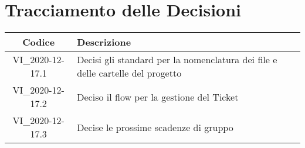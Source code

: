 \section*{Tracciamento delle Decisioni}

\begin{center}
	\begin{longtable}{|c|p{14.5cm}|}
	\hline
	\rowcolor{lighter-grayer}
	\textbf{Codice} & \textbf{Descrizione} \\
	\hline
	\endfirsthead
	\hline
	VI\_2020-12-17.1 & Decisi gli standard per la nomenclatura dei file e delle cartelle del progetto \\
	VI\_2020-12-17.2 & Deciso il flow per la gestione del Ticket \\
	VI\_2020-12-17.3 & Decise le prossime scadenze di gruppo \\
	\hline

	\end{longtable}
\end{center}
